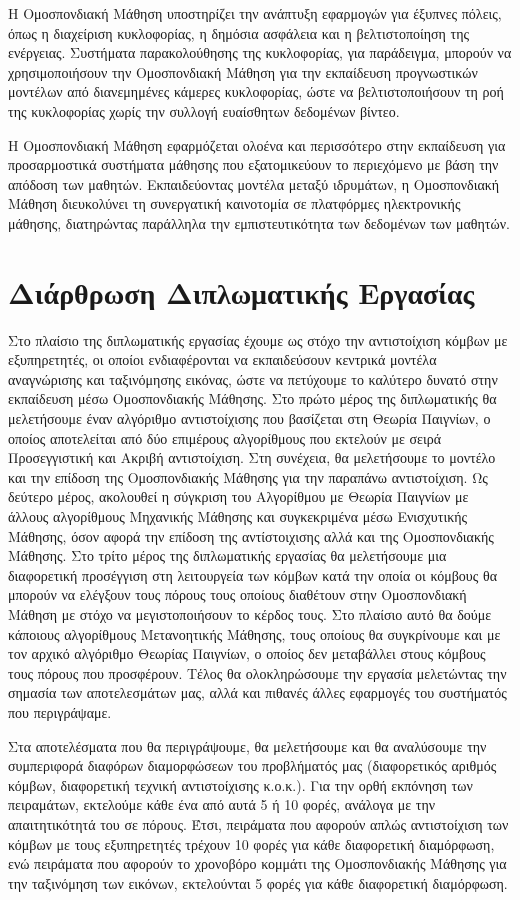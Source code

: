Η Ομοσπονδιακή Μάθηση υποστηρίζει την ανάπτυξη εφαρμογών για έξυπνες πόλεις, όπως η διαχείριση κυκλοφορίας, η δημόσια ασφάλεια και η βελτιστοποίηση της ενέργειας. Συστήματα παρακολούθησης της κυκλοφορίας, για παράδειγμα, μπορούν να χρησιμοποιήσουν την Ομοσπονδιακή Μάθηση για την εκπαίδευση προγνωστικών μοντέλων από διανεμημένες κάμερες κυκλοφορίας, ώστε να βελτιστοποιήσουν τη ροή της κυκλοφορίας χωρίς την συλλογή ευαίσθητων δεδομένων βίντεο.

Η Ομοσπονδιακή Μάθηση εφαρμόζεται ολοένα και περισσότερο στην εκπαίδευση για προσαρμοστικά συστήματα μάθησης που εξατομικεύουν το περιεχόμενο με βάση την απόδοση των μαθητών. Εκπαιδεύοντας μοντέλα μεταξύ ιδρυμάτων, η Ομοσπονδιακή Μάθηση διευκολύνει τη συνεργατική καινοτομία σε πλατφόρμες ηλεκτρονικής μάθησης, διατηρώντας παράλληλα την εμπιστευτικότητα των δεδομένων των μαθητών.

\section{Διάρθρωση Διπλωματικής Εργασίας}

Στο πλαίσιο της διπλωματικής εργασίας έχουμε ως στόχο την αντιστοίχιση κόμβων με εξυπηρετητές, οι οποίοι ενδιαφέρονται να εκπαιδεύσουν κεντρικά μοντέλα αναγνώρισης και ταξινόμησης εικόνας, ώστε να πετύχουμε το καλύτερο δυνατό στην εκπαίδευση μέσω Ομοσπονδιακής Μάθησης. Στο πρώτο μέρος της διπλωματικής θα μελετήσουμε έναν αλγόριθμο αντιστοίχισης που βασίζεται στη Θεωρία Παιγνίων, ο οποίος αποτελείται από δύο επιμέρους αλγορίθμους που εκτελούν με σειρά Προσεγγιστική και Ακριβή αντιστοίχιση. Στη συνέχεια, θα μελετήσουμε το μοντέλο και την επίδοση της Ομοσπονδιακής Μάθησης για την παραπάνω αντιστοίχιση. Ως δεύτερο μέρος, ακολουθεί η σύγκριση του Αλγορίθμου με Θεωρία Παιγνίων με άλλους αλγορίθμους Μηχανικής Μάθησης και συγκεκριμένα μέσω Ενισχυτικής Μάθησης, όσον αφορά την επίδοση της αντίστοιχισης αλλά και της Ομοσπονδιακής Μάθησης. Στο τρίτο μέρος της διπλωματικής εργασίας θα μελετήσουμε μια διαφορετική προσέγγιση στη λειτουργεία των κόμβων κατά την οποία οι κόμβους θα μπορούν να ελέγξουν τους πόρους τους οποίους διαθέτουν στην Ομοσπονδιακή Μάθηση με στόχο να μεγιστοποιήσουν το κέρδος τους. Στο πλαίσιο αυτό θα δούμε κάποιους αλγορίθμους Μετανοητικής Μάθησης, τους οποίους θα συγκρίνουμε και με τον αρχικό αλγόριθμο Θεωρίας Παιγνίων, ο οποίος δεν μεταβάλλει στους κόμβους τους πόρους που προσφέρουν. Τέλος θα ολοκληρώσουμε την εργασία μελετώντας την σημασία των αποτελεσμάτων μας, αλλά και πιθανές άλλες εφαρμογές του συστήματός που περιγράψαμε.

Στα αποτελέσματα που θα περιγράψουμε, θα μελετήσουμε και θα αναλύσουμε την συμπεριφορά διαφόρων διαμορφώσεων του προβλήματός μας (διαφορετικός αριθμός κόμβων, διαφορετική τεχνική αντιστοίχισης κ.ο.κ.). Για την ορθή εκπόνηση των πειραμάτων, εκτελούμε κάθε ένα από αυτά 5 ή 10 φορές, ανάλογα με την απαιτητικότητά του σε πόρους. Έτσι, πειράματα που αφορούν απλώς αντιστοίχιση των κόμβων με τους εξυπηρετητές τρέχουν 10 φορές για κάθε διαφορετική διαμόρφωση, ενώ πειράματα που αφορούν το χρονοβόρο κομμάτι της Ομοσπονδιακής Μάθησης για την ταξινόμηση των εικόνων, εκτελούνται 5 φορές για κάθε διαφορετική διαμόρφωση.